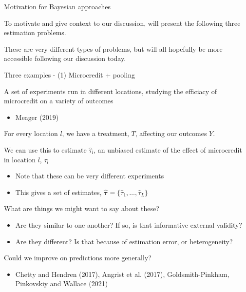 \documentclass[notes,11pt, aspectratio=169]{beamer}
\newenvironment{wideitemize}{\itemize\addtolength{\itemsep}{10pt}}{\enditemize}
\begin{document}
\begin{frame}{Motivation for Bayesian approaches}
  \begin{wideitemize}
  \item To motivate and give context to our discussion, will present the
    following three estimation problems.
  \item These are very different types of problems, but will all
    hopefully be more accessible following our discussion today.
  \end{wideitemize}
\end{frame}
\begin{frame}{Three examples - (1) Microcredit + pooling}
  \begin{wideitemize}
  \item A set of experiments run in different locations, studying the
    efficiacy of microcredit on a variety of outcomes
    \begin{itemize}
    \item Meager (2019)
    \end{itemize}
  \item For every location $l$, we have a treatment, $T$,
    affecting our outcomes $Y$.
  \item We can use this to estimate $\hat{\tau}_{l}$, an unbiased
    estimate of the effect of microcredit in location $l$, $\tau_{l}$
    \begin{itemize}
    \item Note that these can be very different experiments
    \item This gives a set of estimates, $\boldsymbol{\hat{\tau}} = \{\hat{\tau}_{1},\ldots, \hat{\tau}_{L}\}$
    \end{itemize}
  \item What are things we might want to say about these?
    \begin{itemize}
    \item Are they similar to one another? If so, is that informative external validity?
    \item Are they different? Is that because of estimation error, or heterogeneity?
    \end{itemize}
  \item Could we improve on predictions more generally?
    \begin{itemize}
     \item Chetty and Hendren (2017), Angrist et al. (2017),
      Goldsmith-Pinkham, Pinkovskiy and Wallace (2021)
    \end{itemize}
  \end{wideitemize}
\end{frame}
\end{document}
